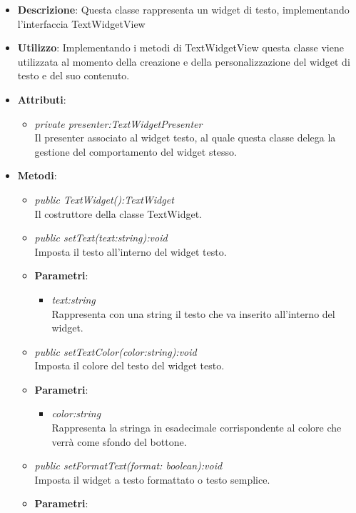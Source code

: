 \begin{itemize}
\item \textbf{Descrizione}: Questa classe rappresenta un widget di testo, implementando l'interfaccia TextWidgetView
\item \textbf{Utilizzo}: Implementando i metodi di TextWidgetView questa classe viene utilizzata al momento della creazione e della personalizzazione del widget di testo e del suo contenuto.
\item \textbf{Attributi}:
	\begin{itemize}
	\item \textit{private presenter:TextWidgetPresenter}\\
	Il presenter associato al widget testo, al quale questa classe delega la gestione del comportamento del widget stesso.
	\end{itemize}
\item \textbf{Metodi}:
	\begin{itemize}
	\item \textit{public TextWidget():TextWidget}\\
	Il costruttore della classe TextWidget.
	\item \textit{public setText(text:string):void}\\
	Imposta il testo all'interno del widget testo.
		\item{\textbf{Parametri}: \begin{itemize}
		\item \textit{text:string}\\
		Rappresenta con una string il testo che va inserito all'interno del widget.
		\end{itemize}}
	\item \textit{public setTextColor(color:string):void}\\
	Imposta il colore del testo del widget testo.
		\item{\textbf{Parametri}: \begin{itemize}
		\item \textit{color:string}\\
		Rappresenta la stringa in esadecimale corrispondente al colore che verrà come sfondo del bottone.
		\end{itemize}}
	\item \textit{public setFormatText(format: boolean):void}\\
	Imposta il widget a testo formattato o testo semplice.
		\item{\textbf{Parametri}: \begin{itemize}

\end{itemize}}
\end{itemize}
\end{itemize}

